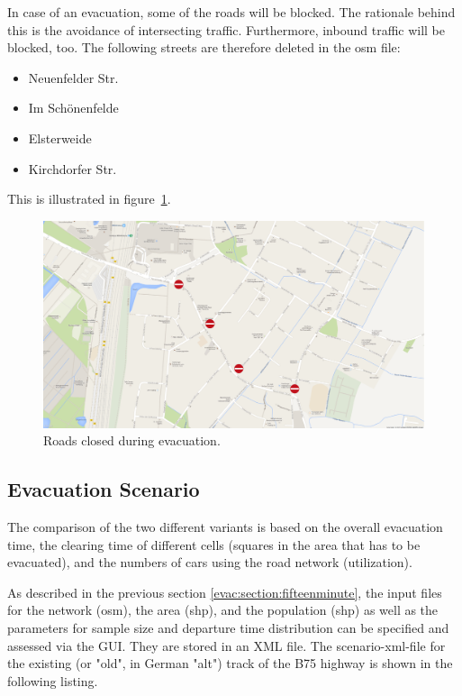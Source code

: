 In case of an evacuation, some of the roads will be blocked. The rationale behind this is the avoidance of intersecting traffic. Furthermore, inbound traffic will be blocked, too.
The following streets are therefore deleted in the osm file:
\begin{itemize}
	\item Neuenfelder Str. 
	\item Im Sch\"onenfelde
	\item Elsterweide
	\item Kirchdorfer Str.
\end{itemize}
This is illustrated in figure~\ref{fig:b75sperrung}.
\begin{figure}
	\centering
	\includegraphics[width=0.7\linewidth]{extending/figures/Evacuation/b75sperrung}
	\caption{Roads closed during evacuation.}
	\label{fig:b75sperrung}
\end{figure}

\subsection{Evacuation Scenario}
The comparison of the two different variants is based on the overall evacuation time, the clearing time of different cells (squares in the area that has to be evacuated), and the numbers of cars using the road network (utilization).

As described in the previous section \ref{evac:section:fifteenminute}, the input files for the network (osm), the area (shp), and the population (shp) as well as the parameters for sample size and departure time distribution can be specified and assessed via the GUI. They are stored in an XML file. The scenario-xml-file for the existing (or "old", in German "alt") track of the B75 highway is shown in the following listing. 



